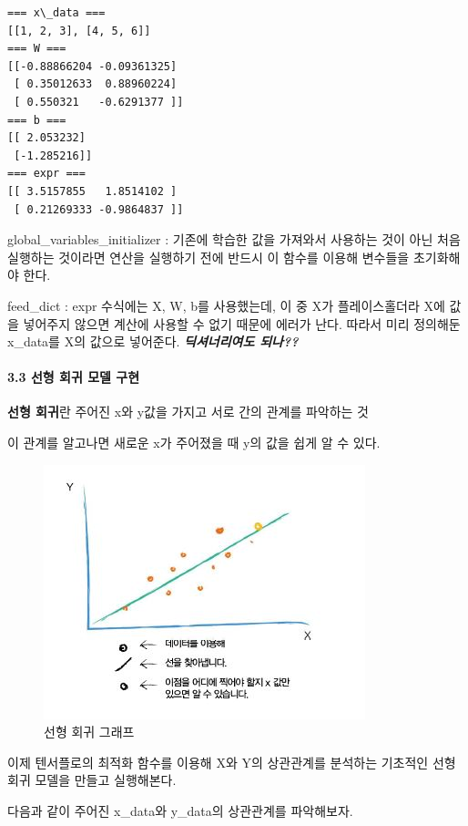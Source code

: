 \documentclass[11pt]{article}
\makeatletter
\def\maxwidth{\ifdim\Gin@nat@width>\linewidth\linewidth
    \else\Gin@nat@width\fi}
\let\Oldincludegraphics\includegraphics
\renewcommand{\includegraphics}[1]{\Oldincludegraphics[width=.8\maxwidth]{#1}}
\makeatother
\begin{document}
    \begin{Verbatim}[commandchars=\\\{\}]
=== x\_data ===
[[1, 2, 3], [4, 5, 6]]
=== W ===
[[-0.88866204 -0.09361325]
 [ 0.35012633  0.88960224]
 [ 0.550321   -0.6291377 ]]
=== b ===
[[ 2.053232]
 [-1.285216]]
=== expr ===
[[ 3.5157855   1.8514102 ]
 [ 0.21269333 -0.9864837 ]]

    \end{Verbatim}

    global\_variables\_initializer : 기존에 학습한 값을 가져와서 사용하는
것이 아닌 처음 실행하는 것이라면 연산을 실행하기 전에 반드시 이 함수를
이용해 변수들을 초기화해야 한다.

feed\_dict : expr 수식에는 X, W, b를 사용했는데, 이 중 X가
플레이스홀더라 X에 값을 넣어주지 않으면 계산에 사용할 수 없기 때문에
에러가 난다. 따라서 미리 정의해둔 x\_data를 X의 값으로 넣어준다.
\textbf{\emph{딕셔너리여도 되나??}}

\paragraph{3.3 선형 회귀 모델
구현}\label{uxc120uxd615-uxd68cuxadc0-uxbaa8uxb378-uxad6cuxd604}

\textbf{선형 회귀}란 주어진 x와 y값을 가지고 서로 간의 관계를 파악하는
것

이 관계를 알고나면 새로운 x가 주어졌을 때 y의 값을 쉽게 알 수 있다.

\begin{figure}
\centering
\includegraphics{./img/img3.JPG}
\caption{선형 회귀 그래프}
\end{figure}

이제 텐서플로의 최적화 함수를 이용해 X와 Y의 상관관계를 분석하는
기초적인 선형 회귀 모델을 만들고 실행해본다.

다음과 같이 주어진 x\_data와 y\_data의 상관관계를 파악해보자.
\end{document}

